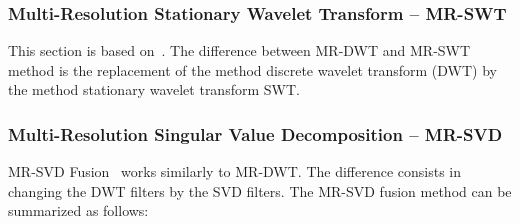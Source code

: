 \documentclass[journal]{IEEEtran}
\begin{document}
\subsubsection{Multi-Resolution Stationary Wavelet Transform -- MR-SWT}  
This section is based on~\cite{n_r, jjly}. The difference between MR-DWT and MR-SWT method is the replacement of the method discrete wavelet transform (DWT) by the method stationary wavelet transform SWT. 

\subsubsection{Multi-Resolution Singular Value Decomposition -- MR-SVD}

MR-SVD Fusion~\cite{naidu} works similarly to MR-DWT. 
The difference consists in changing the DWT filters by the SVD filters. 
The MR-SVD fusion method can be summarized as follows:
\end{document}
